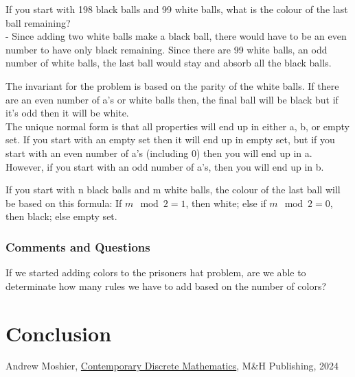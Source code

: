\documentclass{article}
\theoremstyle{theorem}
\theoremstyle{definition}
\theoremstyle{remark}
\begin{document}
If you start with 198 black balls and 99 white balls, what is the colour of the last ball remaining? \\
- Since adding two white balls make a black ball, there would have to be an even number to have only black remaining. Since there are 99 white balls, an odd number of white balls, the last ball would stay and absorb all the black balls. 

The invariant for the problem is based on the parity of the white balls. If there are an even number of a's or white balls then, the final ball will be black but if it's odd then it will be white. \\
The unique normal form is that all properties will end up in either a, b, or empty set. If you start with an empty set then it will end up in empty set, but if you start with an even number of a's (including 0) then you will end up in a. However, if you start with an odd number of a's, then you will end up in b. 

If you start with n black balls and m white balls, the colour of the last ball will be based on this formula:
If \( m \mod 2 = 1 \), then white; else if \( m \mod 2 = 0 \), then black; else empty set.


\subsubsection{Comments and Questions}

If we started adding colors to the prisoners hat problem, are we able to determinate how many rules we have to add based on the number of colors?

\section{Conclusion}\label{conclusion}

\begin{thebibliography}{99}
 Andrew Moshier, \href{https://canvas.chapman.edu/courses/66029/files/6581500?module_item_id=2280521}{Contemporary Discrete Mathematics}, M\&H Publishing, 2024
\end{thebibliography}
\end{document}
